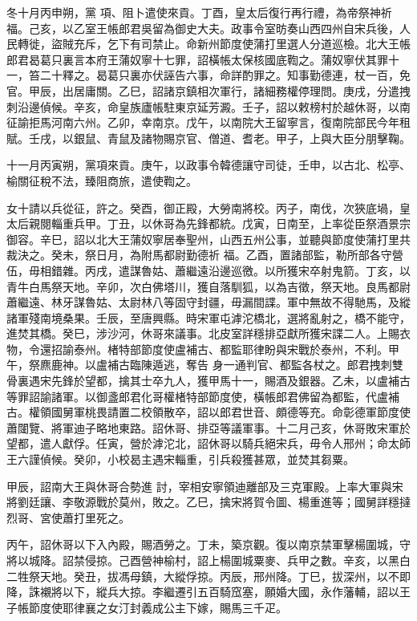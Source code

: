 \begin{pinyinscope}
 冬十月丙申朔，黨
 項、阻卜遣使來貢。丁酉，皇太后復行再行禮，為帝祭神祈福。己亥，以乙室王帳郎君吳留為御史大夫。政事令室昉奏山西四州自宋兵後，人民轉徙，盜賊充斥，乞下有司禁止。命新州節度使蒲打里選人分道巡檢。北大王帳郎君曷葛只裏言本府王蒲奴寧十七罪，詔橫帳太保核國底鞫之。蒲奴寧伏其罪十一，笞二十釋之。曷葛只裏亦伏誣告六事，命詳酌罪之。知事勤德連，杖一百，免官。甲辰，出居庸關。乙巳，詔諸京鎮相次軍行，諸細務權停理問。庚戌，分遣拽刺沿邊偵候。辛亥，命皇族廬帳駐東京延芳澱。壬子，詔以敕榜村於越休哥，以南
 征諭拒馬河南六州。乙卯，幸南京。戊午，以南院大王留寧言，復南院部民今年租賦。壬戌，以銀鼠、青鼠及諸物賜京官、僧道、耆老。甲子，上與大臣分朋擊鞠。



 十一月丙寅朔，黨項來貢。庚午，以政事令韓德讓守司徒，壬申，以古北、松亭、榆關征稅不法，臻阻商旅，遣使鞫之。



 女十請以兵從征，許之。癸酉，御正殿，大勞南將校。丙子，南伐，次狹底堝，皇太后親閱輜重兵甲。丁丑，以休哥為先鋒都統。戊寅，日南至，上率從臣祭酒景宗御容。辛巳，詔以北大王蒲奴寧居奉聖州，山西五州公事，並聽與節度使蒲打里共裁決之。癸未，祭日月，為附馬都尉勤德祈
 福。乙酉，置諸部監，勒所部各守營伍，毋相錯雜。丙戌，遣謀魯姑、蕭繼遠沿邊巡徼。以所獲宋卒射鬼箭。丁亥，以青牛白馬祭天地。辛卯，次白佛塔川，獲自落馴狐，以為吉徵，祭天地。良馬都尉蕭繼遠、林牙謀魯姑、太尉林八等固守封疆，毋漏間諜。軍中無故不得馳馬，及縱諸軍殘南境桑果。壬辰，至唐興縣。時宋軍屯滹沱橋北，選將亂射之，橋不能守，進焚其橋。癸巳，涉沙河，休哥來議事。北皮室詳穩排亞獻所獲宋諜二人。上賜衣物，令還招諭泰州。楮特部節度使盧補古、都監耶律盼與宋戰於泰州，不利。甲午，祭麃鹿神。以盧補古臨陳遁逃，奪告
 身一通判官、都監各杖之。郎君拽刺雙骨裏遇宋先鋒於望都，擒其士卒九人，獲甲馬十一，賜酒及銀器。乙未，以盧補古等罪詔諭諸軍。以御盞郎君化哥權楮特部節度使，橫帳郎君佛留為都監，代盧補古。權領國舅軍桃畏請置二校領散卒，詔以郎君世音、頗德等充。命彰德軍節度使蕭闥覽、將軍迪子略地東路。詔休哥、排亞等議軍事。十二月己亥，休哥敗宋軍於望都，遣人獻俘。任寅，營於滹沱北，詔休哥以騎兵絕宋兵，毋令人邢州；命太師王六謹偵候。癸卯，小校曷主遇宋輜重，引兵殺獲甚眾，並焚其芻粟。



 甲辰，詔南大王與休哥合勢進
 討，宰相安寧領迪離部及三克軍殿。上率大軍與宋將劉廷讓、李敬源戰於莫州，敗之。乙巳，擒宋將賀令圖、楊重進等；國舅詳穩撻烈哥、宮使蕭打里死之。



 丙午，詔休哥以下入內殿，賜酒勞之。丁未，築京觀。復以南京禁軍擊楊圍城，守將以城降。詔禁侵掠。己酉營神榆村，詔上楊圍城粟麥、兵甲之數。辛亥，以黑白二牲祭天地。癸丑，拔馮母鎮，大縱俘掠。丙辰，邢州降。丁巳，拔深州，以不即降，誅襯將以下，縱兵大掠。李繼遷引五百騎窊塞，願婚大國，永作藩輔，詔以王子帳節度使耶律襄之女汀封義成公主下嫁，賜馬三千疋。



\end{pinyinscope}